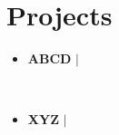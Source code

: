 \documentclass[letterpaper,5pt]{article}
\begin{document}
        
    
    \section{Projects}
    
        \begin{itemize}[leftmargin=0.15in,label={}]
        
          \item{
            \textbf{ABCD} $|$  
            \hfill 
          }
            \begin{itemize}
            \vspace{-5pt}
             
            \vspace{-5pt}
                 
            \   
            \end{itemize}
          
          \item{
            \textbf{XYZ} $|$  
            \hfill 
          }
            \begin{itemize}
            \vspace{-5pt}
             
            \vspace{-5pt}
                 
            \   
            \end{itemize}
          
          
      \end{itemize}
      \vspace*{-6mm}  
        


    
      
    
    
    
    
      
\end{document}
